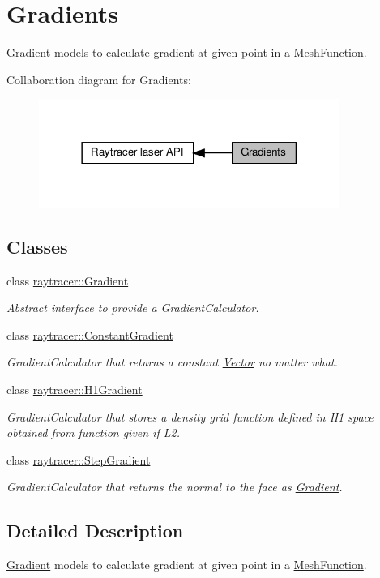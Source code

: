 \hypertarget{group__gradients}{}\section{Gradients}
\label{group__gradients}


\hyperlink{classraytracer_1_1Gradient}{Gradient} models to calculate gradient at given point in a \hyperlink{classraytracer_1_1MeshFunction}{Mesh\+Function}.  


Collaboration diagram for Gradients\+:
\nopagebreak
\begin{figure}[H]
\begin{center}
\leavevmode
\includegraphics[width=278pt]{group__gradients}
\end{center}
\end{figure}
\subsection*{Classes}
\begin{DoxyCompactItemize}
\item 
class \hyperlink{classraytracer_1_1Gradient}{raytracer\+::\+Gradient}
\begin{DoxyCompactList}\small\item\em Abstract interface to provide a Gradient\+Calculator. \end{DoxyCompactList}\item 
class \hyperlink{classraytracer_1_1ConstantGradient}{raytracer\+::\+Constant\+Gradient}
\begin{DoxyCompactList}\small\item\em Gradient\+Calculator that returns a constant \hyperlink{classraytracer_1_1Vector}{Vector} no matter what. \end{DoxyCompactList}\item 
class \hyperlink{classraytracer_1_1H1Gradient}{raytracer\+::\+H1\+Gradient}
\begin{DoxyCompactList}\small\item\em Gradient\+Calculator that stores a density grid function defined in H1 space obtained from function given if L2. \end{DoxyCompactList}\item 
class \hyperlink{classraytracer_1_1StepGradient}{raytracer\+::\+Step\+Gradient}
\begin{DoxyCompactList}\small\item\em Gradient\+Calculator that returns the normal to the face as \hyperlink{classraytracer_1_1Gradient}{Gradient}. \end{DoxyCompactList}\end{DoxyCompactItemize}


\subsection{Detailed Description}
\hyperlink{classraytracer_1_1Gradient}{Gradient} models to calculate gradient at given point in a \hyperlink{classraytracer_1_1MeshFunction}{Mesh\+Function}. 

